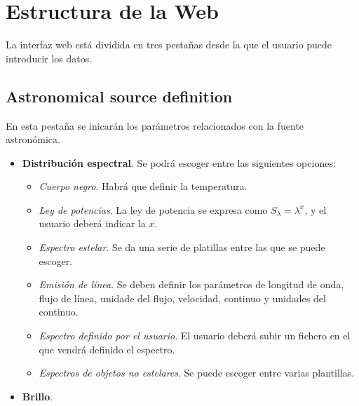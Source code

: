 \section{Estructura de la Web}
La interfaz web est\'a dividida en tres pesta\~nas desde la que el usuario puede introducir los datos.
\subsection{Astronomical source definition}
En esta pesta\~na se inicar\'an los par\'ametros relacionados con la fuente astron\'omica.
\begin{itemize}
    \item \textbf{Distribuci\'on espectral}. Se podr\'a escoger entre las siguientes opciones:
        \begin{itemize}
            \item \textit{Cuerpo negro}. Habr\'a que definir la temperatura.
            \item \textit{Ley de potencias}. La ley de potencia se expresa como $S_\lambda = \lambda^x$, y el usuario deber\'a indicar la $x$.
            \item \textit{Espectro estelar}. Se da una serie de platillas entre las que se puede escoger.
            \item \textit{Emisi\'on de l\'inea}. Se deben definir los par\'ametros de longitud de onda, flujo de l\'inea, unidade del flujo, velocidad, continuo y unidades del continuo.
            \item \textit{Espectro definido por el usuario}. El usuario deber\'a subir un fichero en el que vendr\'a definido el espectro.
            \item \textit{Espectros de objetos no estelares}. Se puede escoger entre varias plantillas.
        \end{itemize}
   \item \textbf{Brillo}. 


\end{itemize}





